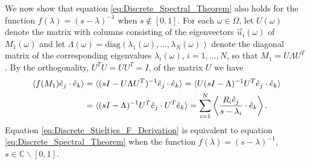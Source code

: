 \documentclass{cmslatex}
\begin{document}
We now show that equation \eqref{eq:Discrete_Spectral_Theorem} also
holds for the function $f(\lambda)=(s-\lambda)^{-1}$ when $s\not\in[0,1]$. For each
$\omega\in\Omega$, let $U(\omega)$ denote the matrix with columns consisting of the
eigenvectors $\vec{u}_i(\omega)$ of $M_1(\omega)$ and let
$\Lambda(\omega)=\text{diag}(\lambda_1(\omega),\ldots,\lambda_N(\omega))$ denote the diagonal matrix of the
corresponding eigenvalues $\lambda_i(\omega)$, $i=1,\ldots,N$, so that $M_1=U\Lambda U^T$
\cite{Halmos-1958}. By the orthogonality, $U^TU=UU^T=I$, of the matrix
$U$ we have   
%
\begin{align}\label{eq:Discrete_Stieltjes_F_Derivation}
     \langle f(M_1)\hat{e}_j\cdot\hat{e}_k\rangle
        &=\langle(sI-U\Lambda U^T)^{-1}\hat{e}_j\cdot\hat{e}_k\rangle
        = \langle U(sI-\Lambda)^{-1}U^T\hat{e}_j\cdot\hat{e}_k\rangle\\
        &=\langle(sI-\Lambda)^{-1}U^T\hat{e}_j\cdot U^T\hat{e}_k\rangle
        =\sum_{i=1}^N\left\langle
          \frac{R_i\hat{e}_j}{s-\lambda_i}\cdot\hat{e}_k
          \right\rangle.               
        \notag
\end{align}
%
Equation \eqref{eq:Discrete_Stieltjes_F_Derivation} is equivalent to equation
\eqref{eq:Discrete_Spectral_Theorem} when the function
$f(\lambda)=(s-\lambda)^{-1}$, $s\in\mathbb{C}\backslash[0,1]$.
\end{document}
